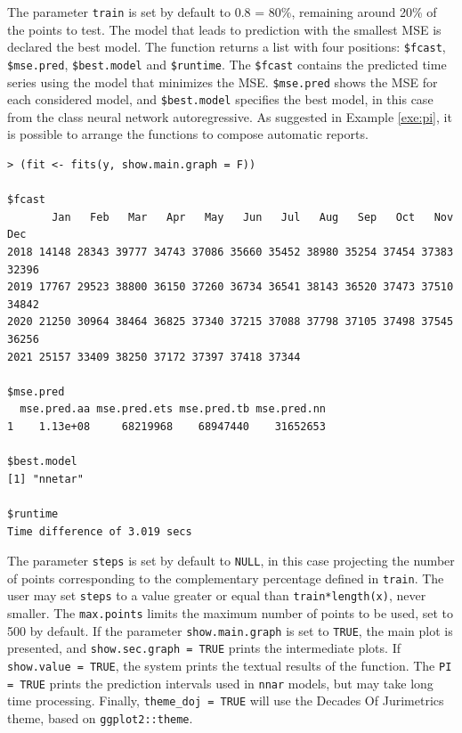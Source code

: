 \documentclass[a4paper]{exam}
\theoremstyle{plain}
\begin{document}
The parameter \texttt{train} is set by default to 0.8 = 80\%, remaining around 20\% of the points to test. The model that leads to prediction with the smallest MSE is declared the best model. The function returns a list with four positions: \texttt{\$fcast}, \texttt{\$mse.pred}, \texttt{\$best.model} and \texttt{\$runtime}. The \texttt{\$fcast} contains the predicted time series using the model that minimizes the MSE. \texttt{\$mse.pred} shows the MSE for each considered model, and \texttt{\$best.model} specifies the best model, in this case from the class neural network autoregressive. As suggested in Example \ref{exe:pi}, it is possible to arrange the functions to compose automatic reports.

\begin{tcolorbox}[colback=black, coltext=white]
\begingroup
  \fontsize{9pt}{9pt}\selectfont
\begin{verbatim}
> (fit <- fits(y, show.main.graph = F))

$fcast
       Jan   Feb   Mar   Apr   May   Jun   Jul   Aug   Sep   Oct   Nov   Dec
2018 14148 28343 39777 34743 37086 35660 35452 38980 35254 37454 37383 32396
2019 17767 29523 38800 36150 37260 36734 36541 38143 36520 37473 37510 34842
2020 21250 30964 38464 36825 37340 37215 37088 37798 37105 37498 37545 36256
2021 25157 33409 38250 37172 37397 37418 37344             

$mse.pred
  mse.pred.aa mse.pred.ets mse.pred.tb mse.pred.nn
1    1.13e+08     68219968    68947440    31652653

$best.model
[1] "nnetar"

$runtime
Time difference of 3.019 secs
\end{verbatim}
\endgroup
\end{tcolorbox}

The parameter \texttt{steps} is set by default to \texttt{NULL}, in this case projecting the number of points corresponding to the complementary percentage defined in \texttt{train}. The user may set \texttt{steps} to a value greater or equal than \texttt{train*length(x)}, never smaller. The \texttt{max.points} limits the maximum number of points to be used, set to 500 by default. If the parameter \texttt{show.main.graph} is set to \texttt{TRUE}, the main plot is presented, and \texttt{show.sec.graph = TRUE} prints the intermediate plots. If \texttt{show.value = TRUE}, the system prints the textual results of the function. The \texttt{PI = TRUE} prints the prediction intervals used in \texttt{nnar} models, but may take long time processing. Finally, \texttt{theme\_doj = TRUE} will use the Decades Of Jurimetrics theme, based on \texttt{ggplot2::theme}.
\end{document}
